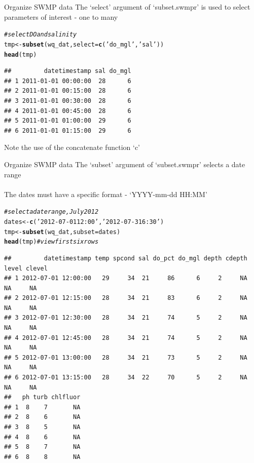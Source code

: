 \documentclass[xcolor=svgnames]{beamer}\usepackage[]{graphicx}\usepackage[]{color}
\makeatletter
\newcommand{\hlstr}[1]{\textcolor[rgb]{0.192,0.494,0.8}{#1}}%
\newcommand{\hlcom}[1]{\textcolor[rgb]{0.678,0.584,0.686}{\textit{#1}}}%
\newcommand{\hlstd}[1]{\textcolor[rgb]{0.345,0.345,0.345}{#1}}%
\newcommand{\hlkwb}[1]{\textcolor[rgb]{0.69,0.353,0.396}{#1}}%
\newcommand{\hlkwc}[1]{\textcolor[rgb]{0.333,0.667,0.333}{#1}}%
\newcommand{\hlkwd}[1]{\textcolor[rgb]{0.737,0.353,0.396}{\textbf{#1}}}%
\newenvironment{kframe}{%
 \def\at@end@of@kframe{}%
 \ifinner\ifhmode%
  \def\at@end@of@kframe{\end{minipage}}%
  \begin{minipage}{\columnwidth}%
 \fi\fi%
 \def\FrameCommand##1{\hskip\@totalleftmargin \hskip-\fboxsep
 \colorbox{shadecolor}{##1}\hskip-\fboxsep
     \hskip-\linewidth \hskip-\@totalleftmargin \hskip\columnwidth}%
 \MakeFramed {\advance\hsize-\width
   \@totalleftmargin\z@ \linewidth\hsize
   \@setminipage}}%
 {\par\unskip\endMakeFramed%
 \at@end@of@kframe}
\newenvironment{knitrout}{}{} %
\makeatother
\begin{document}
\begin{frame}[containsverbatim]{Organize SWMP data}
The `select' argument of `subset.swmpr' is used to select parameters of interest - one to many
\begin{knitrout}\scriptsize
{}\color{fgcolor}\begin{kframe}
\begin{alltt}
\hlcom{# select DO and salinity}
\hlstd{tmp} \hlkwb{<-} \hlkwd{subset}\hlstd{(wq_dat,} \hlkwc{select} \hlstd{=} \hlkwd{c}\hlstd{(}\hlstr{'do_mgl'}\hlstd{,} \hlstr{'sal'}\hlstd{))}
\hlkwd{head}\hlstd{(tmp)}
\end{alltt}
\begin{verbatim}
##         datetimestamp sal do_mgl
## 1 2011-01-01 00:00:00  28      6
## 2 2011-01-01 00:15:00  28      6
## 3 2011-01-01 00:30:00  28      6
## 4 2011-01-01 00:45:00  28      6
## 5 2011-01-01 01:00:00  29      6
## 6 2011-01-01 01:15:00  29      6
\end{verbatim}
\end{kframe}
\end{knitrout}
Note the use of the concatenate function `c'
\end{frame}

\begin{frame}[containsverbatim]{Organize SWMP data}
The `subset' argument of `subset.swmpr' selects a date range \\~\\
The dates must have a specific format - `YYYY-mm-dd HH:MM'
\begin{knitrout}\scriptsize
{}\color{fgcolor}\begin{kframe}
\begin{alltt}
\hlcom{# select a date range, July 2012}
\hlstd{dates} \hlkwb{<-} \hlkwd{c}\hlstd{(}\hlstr{'2012-07-01 12:00'}\hlstd{,} \hlstr{'2012-07-31 6:30'}\hlstd{)}
\hlstd{tmp} \hlkwb{<-} \hlkwd{subset}\hlstd{(wq_dat,} \hlkwc{subset} \hlstd{= dates)}
\hlkwd{head}\hlstd{(tmp)} \hlcom{# view first six rows}
\end{alltt}
\begin{verbatim}
##         datetimestamp temp spcond sal do_pct do_mgl depth cdepth level clevel
## 1 2012-07-01 12:00:00   29     34  21     86      6     2     NA    NA     NA
## 2 2012-07-01 12:15:00   28     34  21     83      6     2     NA    NA     NA
## 3 2012-07-01 12:30:00   28     34  21     74      5     2     NA    NA     NA
## 4 2012-07-01 12:45:00   28     34  21     74      5     2     NA    NA     NA
## 5 2012-07-01 13:00:00   28     34  21     73      5     2     NA    NA     NA
## 6 2012-07-01 13:15:00   28     34  22     70      5     2     NA    NA     NA
##   ph turb chlfluor
## 1  8    7       NA
## 2  8    6       NA
## 3  8    5       NA
## 4  8    6       NA
## 5  8    7       NA
## 6  8    8       NA
\end{verbatim}
\end{kframe}
\end{knitrout}
\end{frame}
\end{document}
